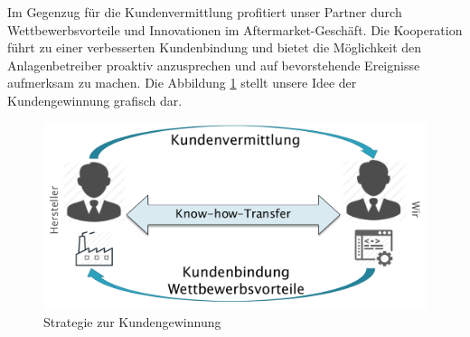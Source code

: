 Im Gegenzug für die Kundenvermittlung profitiert unser Partner durch Wettbewerbsvorteile und Innovationen im Aftermarket-Geschäft. Die Kooperation führt zu einer verbesserten Kundenbindung und bietet die Möglichkeit den Anlagenbetreiber proaktiv anzusprechen und auf bevorstehende Ereignisse aufmerksam zu machen. Die Abbildung \ref{fig:Kundengewinnung} stellt unsere Idee der Kundengewinnung grafisch dar.

\vspace{1cm}
\begin{figure}[H]
\centering
\includegraphics[width=0.7\linewidth]{Bilder/Kundengewinnung}
\caption{Strategie zur Kundengewinnung}
\label{fig:Kundengewinnung}
\end{figure}
